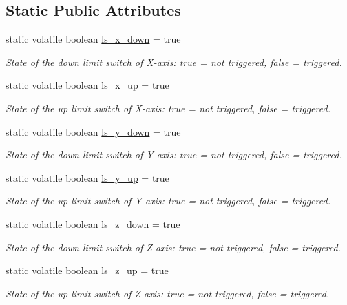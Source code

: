 \subsection*{Static Public Attributes}
\begin{DoxyCompactItemize}
\item 
static volatile boolean \hyperlink{class_c_n_c___router_ac4dbdb689d5b4bb2ed39af36ec07d394}{ls\+\_\+x\+\_\+down} = true
\begin{DoxyCompactList}\small\item\em State of the down limit switch of X-\/axis\+: true = not triggered, false = triggered. \end{DoxyCompactList}\item 
static volatile boolean \hyperlink{class_c_n_c___router_a63dab669f0dd34b0306c16b61816e751}{ls\+\_\+x\+\_\+up} = true
\begin{DoxyCompactList}\small\item\em State of the up limit switch of X-\/axis\+: true = not triggered, false = triggered. \end{DoxyCompactList}\item 
static volatile boolean \hyperlink{class_c_n_c___router_a1932890e5458f9113355f1bdb854e1ce}{ls\+\_\+y\+\_\+down} = true
\begin{DoxyCompactList}\small\item\em State of the down limit switch of Y-\/axis\+: true = not triggered, false = triggered. \end{DoxyCompactList}\item 
static volatile boolean \hyperlink{class_c_n_c___router_a74a44cdb470bb6256551bffc3538b938}{ls\+\_\+y\+\_\+up} = true
\begin{DoxyCompactList}\small\item\em State of the up limit switch of Y-\/axis\+: true = not triggered, false = triggered. \end{DoxyCompactList}\item 
static volatile boolean \hyperlink{class_c_n_c___router_a30b5c6e169b20b9d8b11be6d638b2958}{ls\+\_\+z\+\_\+down} = true
\begin{DoxyCompactList}\small\item\em State of the down limit switch of Z-\/axis\+: true = not triggered, false = triggered. \end{DoxyCompactList}\item 
static volatile boolean \hyperlink{class_c_n_c___router_a1f573ec5b6c857e5aee5cebb7ad9c158}{ls\+\_\+z\+\_\+up} = true
\begin{DoxyCompactList}\small\item\em State of the up limit switch of Z-\/axis\+: true = not triggered, false = triggered. \end{DoxyCompactList}\end{DoxyCompactItemize}
